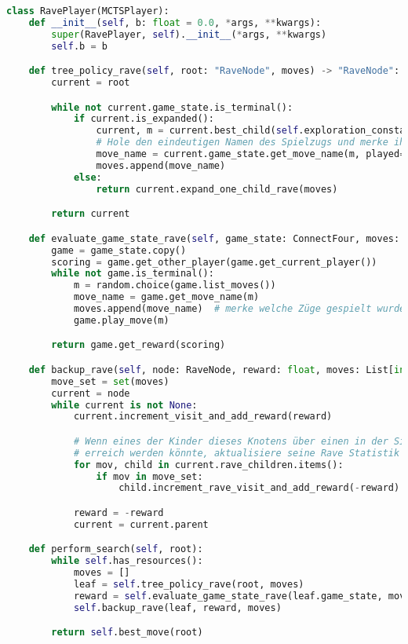 \begin{lstlisting}[language=Python,label={lst:raveplayer}]
class RavePlayer(MCTSPlayer):
    def __init__(self, b: float = 0.0, *args, **kwargs):
        super(RavePlayer, self).__init__(*args, **kwargs)
        self.b = b

    def tree_policy_rave(self, root: "RaveNode", moves) -> "RaveNode":
        current = root

        while not current.game_state.is_terminal():
            if current.is_expanded():
                current, m = current.best_child(self.exploration_constant, b=self.b)
                # Hole den eindeutigen Namen des Spielzugs und merke ihn
                move_name = current.game_state.get_move_name(m, played=True)
                moves.append(move_name)
            else:
                return current.expand_one_child_rave(moves)

        return current

    def evaluate_game_state_rave(self, game_state: ConnectFour, moves: List[int]) -> float:
        game = game_state.copy()
        scoring = game.get_other_player(game.get_current_player())
        while not game.is_terminal():
            m = random.choice(game.list_moves())
            move_name = game.get_move_name(m)
            moves.append(move_name)  # merke welche Züge gespielt wurden
            game.play_move(m)

        return game.get_reward(scoring)

    def backup_rave(self, node: RaveNode, reward: float, moves: List[int]):
        move_set = set(moves)
        current = node
        while current is not None:
            current.increment_visit_and_add_reward(reward)

            # Wenn eines der Kinder dieses Knotens über einen in der Simulation gemachten Spielzug
            # erreich werden könnte, aktualisiere seine Rave Statistik
            for mov, child in current.rave_children.items():
                if mov in move_set:
                    child.increment_rave_visit_and_add_reward(-reward)

            reward = -reward
            current = current.parent

    def perform_search(self, root):
        while self.has_resources():
            moves = []
            leaf = self.tree_policy_rave(root, moves)
            reward = self.evaluate_game_state_rave(leaf.game_state, moves)
            self.backup_rave(leaf, reward, moves)

        return self.best_move(root)
\end{lstlisting}


